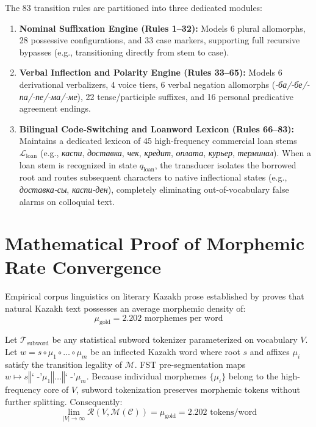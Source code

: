 The 83 transition rules are partitioned into three dedicated modules:
\begin{enumerate}
    \item \textbf{Nominal Suffixation Engine (Rules 1--32):} Models 6 plural allomorphs, 28 possessive configurations, and 33 case markers, supporting full recursive bypasses (e.g., transitioning directly from stem to case).
    \item \textbf{Verbal Inflection and Polarity Engine (Rules 33--65):} Models 6 derivational verbalizers, 4 voice tiers, 6 verbal negation allomorphs (\textit{-ба/-бе/-па/-пе/-ма/-ме}), 22 tense/participle suffixes, and 16 personal predicative agreement endings.
    \item \textbf{Bilingual Code-Switching and Loanword Lexicon (Rules 66--83):} Maintains a dedicated lexicon of 45 high-frequency commercial loan stems $\mathcal{L}_{\text{loan}}$ (e.g., \textit{каспи}, \textit{доставка}, \textit{чек}, \textit{кредит}, \textit{оплата}, \textit{курьер}, \textit{терминал}). When a loan stem is recognized in state $q_{\text{loan}}$, the transducer isolates the borrowed root and routes subsequent characters to native inflectional states (e.g., \textit{доставка-сы}, \textit{каспи-ден}), completely eliminating out-of-vocabulary false alarms on colloquial text.
\end{enumerate}

\section{Mathematical Proof of Morphemic Rate Convergence}
\label{sec:ling_convergence_proof}

Empirical corpus linguistics on literary Kazakh prose established by \citet{makhambetov2013kazakh} proves that natural Kazakh text possesses an average morphemic density of:
\begin{equation}
\mu_{\text{gold}} = 2.202 \text{ morphemes per word}
\end{equation}

\begin{theorem}
Let $\mathcal{T}_{\text{subword}}$ be any statistical subword tokenizer parameterized on vocabulary $V$. Let $w = s \circ \mu_1 \circ \dots \circ \mu_m$ be an inflected Kazakh word where root $s$ and affixes $\mu_i$ satisfy the transition legality of $\mathcal{M}$. FST pre-segmentation maps $w \mapsto s \mathbin{\Vert} \text{` -'} \mu_1 \mathbin{\Vert} \dots \mathbin{\Vert} \text{` -'} \mu_m$. Because individual morphemes $\{\mu_i\}$ belong to the high-frequency core of $V$, subword tokenization preserves morphemic tokens without further splitting. Consequently:
\begin{equation}
\lim_{|V| \to \infty} \mathcal{R}(V, \mathcal{M}(\mathcal{C})) = \mu_{\text{gold}} = 2.202 \text{ tokens/word}
\end{equation}
\end{theorem}

